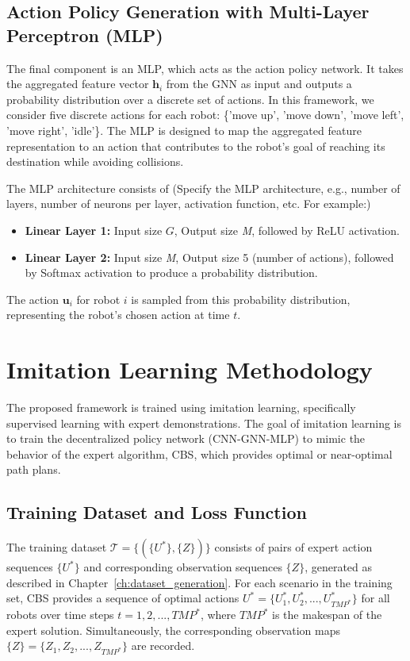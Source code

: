 \subsection{Action Policy Generation with Multi-Layer Perceptron (MLP)}

The final component is an MLP, which acts as the action policy network. It takes the aggregated feature vector $\mathbf{h}_i$ from the GNN as input and outputs a probability distribution over a discrete set of actions. In this framework, we consider five discrete actions for each robot: \{'move up', 'move down', 'move left', 'move right', 'idle'\}. The MLP is designed to map the aggregated feature representation to an action that contributes to the robot's goal of reaching its destination while avoiding collisions.

The MLP architecture consists of (Specify the MLP architecture, e.g., number of layers, number of neurons per layer, activation function, etc. For example:)

\begin{itemize}
    \item \textbf{Linear Layer 1:} Input size $G$, Output size \textit{M}, followed by ReLU activation.
    \item \textbf{Linear Layer 2:} Input size \textit{M}, Output size 5 (number of actions), followed by Softmax activation to produce a probability distribution.
\end{itemize}

The action $\mathbf{u}_i$ for robot $i$ is sampled from this probability distribution, representing the robot's chosen action at time $t$.

\section{Imitation Learning Methodology}

The proposed framework is trained using imitation learning, specifically supervised learning with expert demonstrations. The goal of imitation learning is to train the decentralized policy network (CNN-GNN-MLP) to mimic the behavior of the expert algorithm, CBS, which provides optimal or near-optimal path plans.

\subsection{Training Dataset and Loss Function}

The training dataset $\mathcal{T} = \{(\{U^*\}, \{Z\})\}$ consists of pairs of expert action sequences $\{U^*\}$ and corresponding observation sequences $\{Z\}$, generated as described in Chapter~\ref{ch:dataset_generation}. For each scenario in the training set, CBS provides a sequence of optimal actions $U^* = \{U^*_1, U^*_2, ..., U^*_{TMP^*}\}$ for all robots over time steps $t = 1, 2, ..., TMP^*$, where $TMP^*$ is the makespan of the expert solution. Simultaneously, the corresponding observation maps $\{Z\} = \{Z_1, Z_2, ..., Z_{TMP^*}\}$ are recorded.

